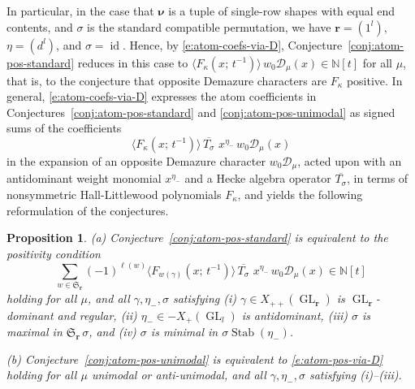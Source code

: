 \documentclass[12pt]{amsart}
\newtheorem{prop}[thm]{Proposition}
\theoremstyle{definition}
\theoremstyle{remark}
\newcommand{\NN}{{\mathbb N}}
\newcommand{\rr}{{\mathbf r}}
\newcommand{\nubold}{{\boldsymbol \nu }}
\newcommand{\Sfrak}{{\mathfrak S}}
\newcommand{\Dcal}{{\mathcal D}}
\DeclareMathOperator{\GL}{GL}
\DeclareMathOperator{\Stab}{Stab}
\begin{document}
In particular, in the case that $\nubold $ is a tuple of single-row
shapes with equal end contents, and $\sigma $ is the standard
compatible permutation, we have $\rr =(1^{l})$, $\eta =(d^{l})$, and
$\sigma =\operatorname{id}$.  Hence, by \eqref{e:atom-coefs-via-D},
Conjecture~\ref{conj:atom-pos-standard} reduces in this case to
$\langle F_{\kappa }(x;\, t^{-1}) \rangle\, w_{0} \Dcal _{\mu }(x)\in
\NN [t]$ for all $\mu $, that is, to the conjecture that opposite
Demazure characters are $F_{\kappa }$ positive.  In general,
\eqref{e:atom-coefs-via-D} expresses the atom coefficients in
Conjectures~\ref{conj:atom-pos-standard} and
\ref{conj:atom-pos-unimodal} as signed sums of the coefficients
\begin{equation}\label{e:D-to-F-with-twist}
\langle F_{\kappa }(x;\, t^{-1}) \rangle\, \overline{T_{\sigma }}\, \,
x^{\eta _{-}}\, w_{0} \Dcal _{\mu }(x)
\end{equation}
in the expansion of an opposite Demazure character $w_{0}\Dcal _{\mu
}$, acted upon with an antidominant weight monomial $x^{\eta _{-}}$
and a Hecke algebra operator $\overline{T_{\sigma }}$, in terms of
nonsymmetric Hall-Littlewood polynomials $F_{\kappa }$,
and yields the following reformulation of the conjectures.



\begin{prop}\label{prop:atom-pos-via-D}
(a) Conjecture~\ref{conj:atom-pos-standard} is equivalent to the
positivity condition
\begin{equation}\label{e:atom-pos-via-D}
\sum _{w\in \Sfrak _{\rr }} (-1)^{\ell (w)} \langle F_{w(\gamma
)}(x;\, t^{-1}) \rangle\, \overline{T_{\sigma }}\, \, x^{\eta _{-}}\,
w_{0} \Dcal _{\mu }(x)\in \NN [t]
\end{equation}
holding for all $\mu $, and all $\gamma, \eta_-, \sigma$ satisfying (i) $\gamma \in X_{++}(\GL _{\rr})$ is
$\GL _{\rr}$-dominant and regular, (ii) $\eta _{-}\in -X_{+}(\GL _{l})$ is
antidominant, (iii) $\sigma $ is maximal in $\Sfrak _{\rr }\, \sigma $,
and (iv) $\sigma $ is minimal in $\sigma \Stab (\eta _{-})$.

(b) Conjecture~\ref{conj:atom-pos-unimodal} is equivalent to
\eqref{e:atom-pos-via-D} holding for all $\mu $ unimodal or
anti-unimodal, and all $\gamma, \eta_-, \sigma$ satisfying (i)--(iii).
\end{prop}
\end{document}
